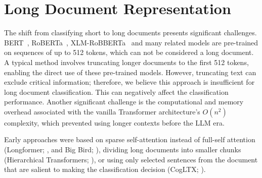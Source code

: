 \section{Long Document Representation}
\label{sec:long_doc}

The shift from classifying short to long documents presents significant challenges. BERT~\parencite{devlin2018bert}, RoBERTa~\parencite{liu2019roberta}, XLM-RoBBERTa~\parencite{conneau2019xlmr} and many related models are pre-trained on sequences of up to 512 tokens, which can not be considered a long document. A typical method involves truncating longer documents to the first 512 tokens, enabling the direct use of these pre-trained models. 
However, truncating text can exclude critical information; therefore, we believe this approach is insufficient for long document classification. 
This can negatively affect the classification performance. 
Another significant challenge is the computational and memory overhead associated with the vanilla Transformer architecture's $O(n^2)$ complexity, which prevented using longer contexts before the LLM era.

Early approaches were based on sparse self-attention instead of full-self attention (Longformer; \textcite{beltagy2020longformerlongdocumenttransformer},  and Big Bird; \textcite{zaheer2021bigbird}), dividing long documents into smaller chunks (Hierarchical Transformers; \textcite{pappagari2019hierarchical}), or using only selected sentences from the document that are salient to making the classification decision (CogLTX; \textcite{ding2020cogltx}).

\begin{table}[H]
	\centering
\caption{Statistics on the datasets. \# BERT Tokens refers to the average token count obtained via the tokenizer of the BERT base model (uncased). \% Long refers to the percentage of documents with more than 512 BERT tokens~\parencite{park2022efficient}.}
\label{tab:park_dataset}
\end{table}

